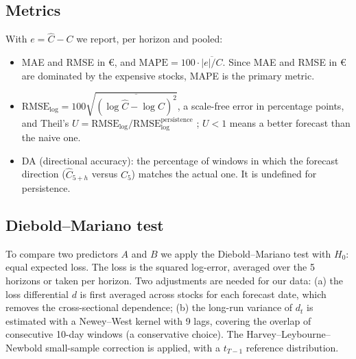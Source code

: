 \documentclass[11pt,a4paper]{article}
\begin{document}


\subsection{Metrics}
With $e=\hat C-C$ we report, per horizon and pooled:
\begin{itemize}[leftmargin=*]
  \item MAE and RMSE in €, and $\mathrm{MAPE}=100\cdot\overline{|e|/C}$. Since MAE and RMSE in € are dominated by the expensive stocks, MAPE is the primary metric.
  \item $\mathrm{RMSE}_{\log}=100\sqrt{\overline{(\log\hat C-\log C)^2}}$, a scale-free error in percentage points, and Theil's $U=\mathrm{RMSE}_{\log}/\mathrm{RMSE}_{\log}^{\text{persistence}}$ \cite{theil1966}; $U<1$ means a better forecast than the naive one.
  \item DA (directional accuracy): the percentage of windows in which the forecast direction ($\hat C_{5+h}$ versus $C_5$) matches the actual one. It is undefined for persistence.
\end{itemize}

\subsection{Diebold--Mariano test}
To compare two predictors $A$ and $B$ we apply the Diebold--Mariano test \cite{diebold1995} with $H_0$: equal expected loss. The loss is the squared log-error, averaged over the 5 horizons or taken per horizon. Two adjustments are needed for our data: (a) the loss differential $d$ is first averaged across stocks for each forecast date, which removes the cross-sectional dependence; (b) the long-run variance of $d_t$ is estimated with a Newey--West kernel \cite{newey1987} with 9 lags, covering the overlap of consecutive 10-day windows (a conservative choice). The Harvey--Leybourne--Newbold small-sample correction \cite{harvey1997} is applied, with a $t_{T-1}$ reference distribution.


\end{document}
